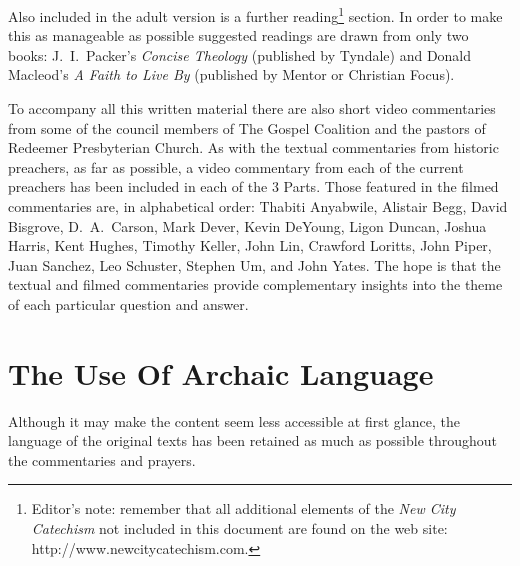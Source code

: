 \documentclass[titlepage]{memoir}
\begin{document}
Also included in the adult version is a further reading\footnote{Editor's note: remember that all additional elements of the \emph{New City Catechism}\/ not included in this document are found on the web site: http:/\slash{}www.new\hspace{0em}city\hspace{0em}cate\hspace{0em}chism.\hspace{0em}com.} section. In order to make this as manageable as possible suggested readings are drawn from only two books: J.~I.\ Packer's \emph{Concise Theology}\/ (published by Tyndale) and Donald Macleod's \emph{A Faith to Live By}\/ (published by Mentor or Christian Focus).

To accompany all this written material there are also short video commentaries from some of the council members of The Gospel Coalition and the pastors of Redeemer Presbyterian Church. As with the textual commentaries from historic preachers, as far as possible, a video commentary from each of the current preachers has been included in each of the 3 Parts. Those featured in the filmed commentaries are, in alphabetical order: Thabiti Anyabwile, Alistair Begg, David Bisgrove, D.~A.\ Carson, Mark Dever, Kevin DeYoung, Ligon Duncan, Joshua Harris, Kent Hughes, Timothy Keller, John Lin, Crawford Loritts, John Piper, Juan Sanchez, Leo Schuster, Stephen Um, and John Yates. The hope is that the textual and filmed commentaries provide complementary insights into the theme of each particular question and answer.

\section{The Use Of Archaic Language}
Although it may make the content seem less accessible at first glance, the language of the original texts has been retained as much as possible throughout the commentaries and prayers.
\end{document}
